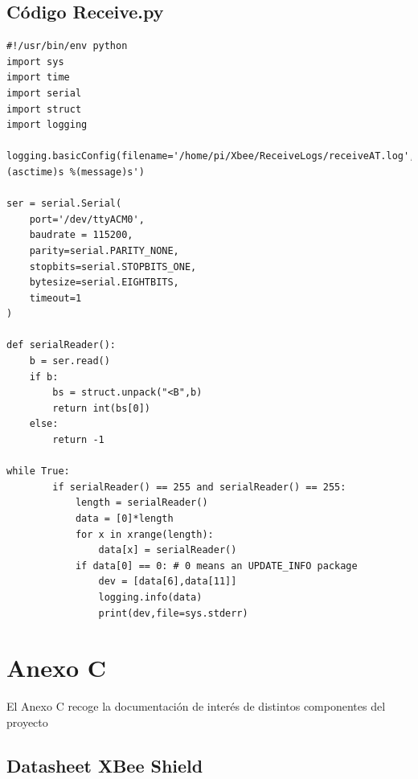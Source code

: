 \section{Código Receive.py}

\begin{lstlisting}[frame=leftline, caption={Receive.py}, label=code:Receive]
#!/usr/bin/env python
import sys
import time
import serial
import struct
import logging

logging.basicConfig(filename='/home/pi/Xbee/ReceiveLogs/receiveAT.log',level=logging.DEBUG,format='%(asctime)s %(message)s')

ser = serial.Serial(
	port='/dev/ttyACM0',
	baudrate = 115200,
	parity=serial.PARITY_NONE,
	stopbits=serial.STOPBITS_ONE,
	bytesize=serial.EIGHTBITS,
	timeout=1
)

def serialReader():
    b = ser.read()
    if b:
        bs = struct.unpack("<B",b)
        return int(bs[0])
    else:
        return -1

while True:
        if serialReader() == 255 and serialReader() == 255:
            length = serialReader()
            data = [0]*length
            for x in xrange(length):
                data[x] = serialReader()
            if data[0] == 0: # 0 means an UPDATE_INFO package
                dev = [data[6],data[11]]
                logging.info(data)
                print(dev,file=sys.stderr)
\end{lstlisting}

\chapter{Anexo C}

El Anexo C recoge la documentación de interés de distintos componentes del proyecto

\section{Datasheet XBee Shield}